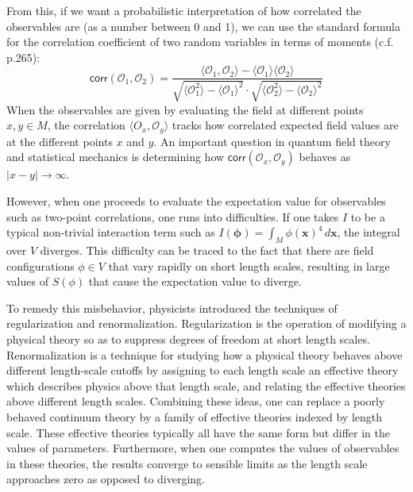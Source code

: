 \documentclass[12pt]{article}
\theoremstyle{definition}
\theoremstyle{plain}
\begin{document}
From this, if we want a probabilistic interpretation of how correlated the observables are (as a number between 0 and 1), we can use the standard formula for the correlation coefficient of two random variables in terms of moments (c.f. \cite{stats} p.265):
\begin{equation}
    \mathsf{corr}(\mathcal{O}_1,\mathcal{O}_2) = \frac{\langle \mathcal{O}_1,\mathcal{O}_2\rangle - \langle \mathcal{O}_1\rangle\langle \mathcal{O}_2\rangle}{\sqrt{\langle \mathcal{O}_1^2\rangle - \langle \mathcal{O}_1\rangle^2}\cdot\sqrt{\langle \mathcal{O}_2^2\rangle - \langle \mathcal{O}_2\rangle^2}}
\end{equation}
When the observables are given by evaluating the field at different points $x,y\in M$, the correlation $\langle O_x,\mathcal{O}_y\rangle$ tracks how correlated expected field values are at the different points $x$ and $y$. An important question in quantum field theory and statistical mechanics is determining how \(\mathsf{corr}(\mathcal{O}_x,\mathcal{O}_y)\) behaves as \(|x - y| \to \infty\).

However, when one proceeds to evaluate the expectation value for observables such as two-point correlations, one runs into difficulties.  If one takes \(I\) to be a typical non-trivial interaction term such as \(I(\boldsymbol{\phi}) = \int_M \phi (\boldsymbol{x})^4 \, d\boldsymbol{x}\), the integral over \(V\) diverges.  This difficulty can be traced to the fact that 
there are field configurations $\phi\in V$ that vary rapidly on short length scales, resulting in large values of $S(\phi)$ that cause the expectation value to diverge.

To remedy this misbehavior, physicists introduced the techniques of regularization and renormalization.  Regularization is the operation of modifying a physical theory so as to suppress degrees of freedom at short length scales. Renormalization is a technique for studying how a physical theory behaves above different length-scale cutoffs by assigning to each length scale an effective theory which describes physics above that length scale, and relating the effective theories above different length scales. Combining these ideas, one can replace a poorly behaved continuum theory by a family of effective theories indexed by length scale. These effective theories typically all have the same form but differ in the values of parameters. Furthermore, when one computes the values of observables in these theories, the results converge to sensible limits as the length scale approaches zero as opposed to diverging.
\end{document}
